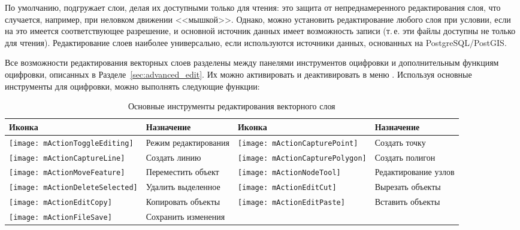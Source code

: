 По умолчанию, \qg подгружает слои, делая их доступными только для чтения:
это защита от непреднамеренного редактирования слоя, что случается, например,
при неловком движении <<мышкой>>. Однако, можно установить редактирование любого слоя
при условии, если на это имеется соответствующее разрешение, и основной
источник данных имеет возможность записи (т.\,е. эти файлы доступны не только
для чтения). Редактирование слоев наиболее универсально, если используются
источники данных, основанных на PostgreSQL/PostGIS.

Все возможности редактирования векторных слоев разделены между панелями
инструментов оцифровки и дополнительным функциям оцифровки, описанных в
Разделе~\ref{sec:advanced_edit}. Их можно активировать и деактивировать
в меню  \arrow {}.
Используя основные инструменты для оцифровки, можно выполнять следующие
функции:

\begin{table}[ht]
\centering
\begin{tabular}{|l|p{5.5cm}|l|p{5.5cm}|}
\hline \textbf{Иконка} & \textbf{Назначение} & \textbf{Иконка} & \textbf{Назначение} \\
\hline \texttt{[image: mActionToggleEditing]}
   & Режим редактирования
   & \texttt{[image: mActionCapturePoint]}
   & Создать точку \\
\hline \texttt{[image: mActionCaptureLine]}
   & Создать линию
   & \texttt{[image: mActionCapturePolygon]}
   & Создать полигон \\
\hline \texttt{[image: mActionMoveFeature]}
   & Переместить объект
   & \texttt{[image: mActionNodeTool]}
   & Редактирование узлов \\
\hline \texttt{[image: mActionDeleteSelected]}
   & Удалить выделенное
   & \texttt{[image: mActionEditCut]}
   & Вырезать объекты \\
\hline \texttt{[image: mActionEditCopy]}
   & Копировать объекты
   & \texttt{[image: mActionEditPaste]}
   & Вставить объекты \\
\hline \texttt{[image: mActionFileSave]}
   & Сохранить изменения
   &  &  \\
\hline
\end{tabular}
\caption{Основные инструменты редактирования векторного слоя}\label{tab:vector_editing}\medskip
\end{table}

